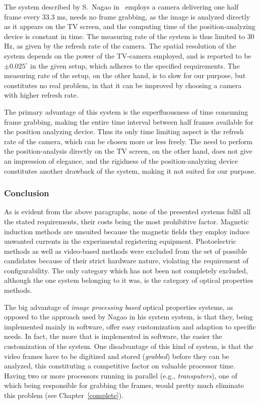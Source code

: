The system described by S.\ Nagao in~\cite{tv} employs a camera
delivering one half frame every 33.3 ms, needs no frame grabbing, as
the image is analyzed directly as it appears on the TV screen, and the
computing time of the position-analyzing device is constant in time.
The measuring rate of the system is thus limited to 30 Hz, as given by
the refresh rate of the camera.  The spatial resolution of the system
depends on the power of the TV-camera employed, and is reported to be
$\pm 0.025^{\circ}$ in the given setup, which adheres to the specified
requirements.  The measuring rate of the setup, on the other hand, is
to slow for our purpose, but constitutes no real problem, in that it
can be improved by choosing a camera with higher refresh rate.

The primary advantage of this system is the superfluousness of time
consuming frame grabbing, making the entire time interval between half
frames available for the position analyzing device.  Thus its only
time limiting aspect is the refresh rate of the camera, which can be
chosen more or less freely.  The need to perform the position-analysis
directly on the TV screen, on the other hand, does not give an
impression of elegance, and the rigidness of the position-analyzing
device constitutes another drawback of the system, making it not
suited for our purpose.

\subsubsection{Conclusion}

As is evident from the above paragraphs, none of the presented systems
fulfil all the stated requirements, their costs being the most
prohibitive factor.  Magnetic induction methods are unsuited because
the magnetic fields they employ induce unwanted currents in the
experimental registering equipment.  Photoelectric methods as well as
video-based methods were excluded from the set of possible candidates
because of their strict hardware nature, violating the requirement of
configurability.  The only category which has not been not completely
excluded, although the one system belonging to it was, is the category
of optical properties methods.

The big advantage of {\em image processing based\/} optical properties
systems, as opposed to the approach used by Nagao in his system
system, is that they, being implemented mainly in software, offer easy
customization and adaption to specific needs.  In fact, the more that
is implemented in software, the easier the customization of the
system.  One disadvantage of this kind of system, is that the video
frames have to be digitized and stored ({\em grabbed\/}) before they
can be analyzed, this constituting a competitive factor on valuable
processor time.  Having two or more processors running in parallel
(e.g., {\em transputers\/}), one of which being responsible for
grabbing the frames, would pretty much eliminate this problem (see
Chapter~\ref{complete}).

